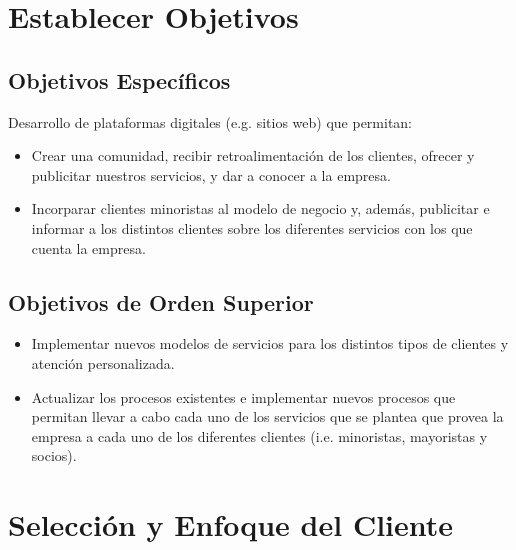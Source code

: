 


	\clearpage
	\vspace*{6pt}
	\centerline{\textbf{\huge \theTitle}}
	\vspace*{8pt}

	\section{Establecer Objetivos}

	\subsection{Objetivos Específicos}

	Desarrollo de plataformas digitales (e.g. sitios web) que permitan:

	\begin{itemize}
		\item Crear una comunidad, recibir retroalimentación de los
			clientes, ofrecer y publicitar nuestros servicios, y dar a
			conocer a la empresa.

		\item Incorparar clientes minoristas al modelo de negocio y,
			además, publicitar e informar a los distintos clientes sobre los
			diferentes servicios con los que cuenta la empresa.
	\end{itemize}

	\subsection{Objetivos de Orden Superior}

	\begin{itemize}
		\item Implementar nuevos modelos de servicios para los distintos tipos
			de clientes y atención personalizada.

		\item Actualizar los procesos existentes e implementar nuevos procesos
			que permitan llevar a cabo cada uno de los servicios que se plantea
			que provea la empresa a cada uno de los diferentes clientes (i.e.
			minoristas, mayoristas y socios).
	\end{itemize}

	\section{Selección y Enfoque del Cliente}

